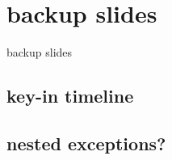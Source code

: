 \date{}
\title{}
\date{}

\begin{frame}
    \titlepage
\end{frame}





\section{backup slides}
\begin{frame}{backup slides}
\end{frame}

\subsection{key-in timeline}


\subsection{nested exceptions?}


